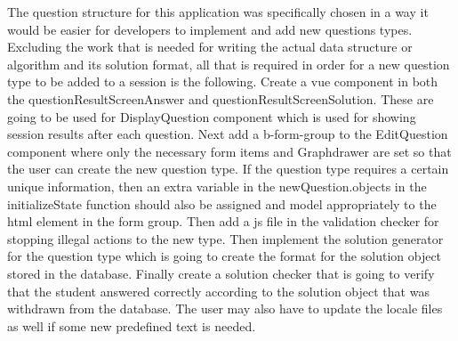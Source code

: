 The question structure for this application was specifically chosen in a way it would be easier for developers to implement and add new questions types. Excluding the work that is needed for writing the actual data structure or algorithm and its solution format, all that is required in order for a new question type to be added to a session is the following. Create a vue component in both the questionResultScreenAnswer and questionResultScreenSolution. These are going to be used for DisplayQuestion component which is used for showing session results after each question. Next add a b-form-group to the EditQuestion component where only the necessary form items and Graphdrawer are set so that the user can create the new question type. If the question type requires a certain unique information, then an extra variable in the newQuestion.objects in the initializeState function should also be assigned and model appropriately to the html element in the form group. Then add a js file in the validation checker for stopping illegal actions to the new type. Then implement the solution generator for the question type which is going to create the format for the solution object stored in the database. Finally create a solution checker that is going to verify that the student answered correctly according to the solution object that was withdrawn from the database. The user may also have to update the locale files as well if some new predefined text is needed.\\[11pt]

